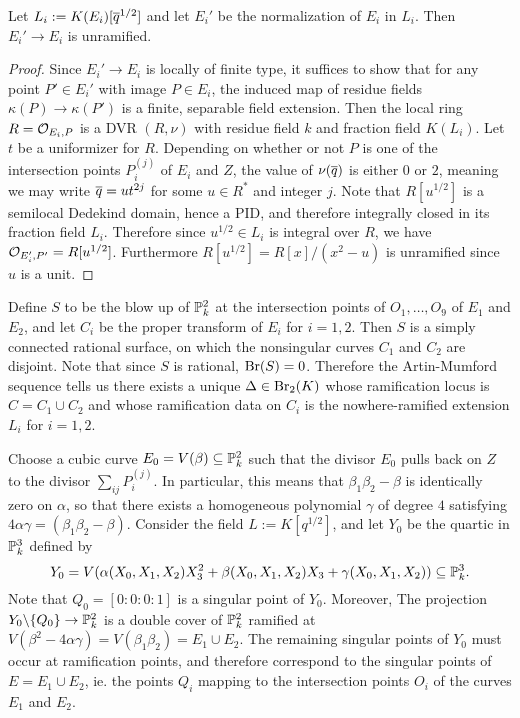 \begin{lem}
Let $L_i:=K(E_i)[\overline{q}^{1/2}]$ and let $E_i'$ be the normalization of $E_i$ in $L_i$.  Then $E_i'\rightarrow E_i$ is unramified.
\end{lem}
\begin{proof}
Since $E_i'\rightarrow E_i$ is locally of finite type, it suffices to show that for any point $P'\in E_i'$ with image $P\in E_i$, the induced map of residue fields $\kappa(P)\rightarrow\kappa(P')$ is a finite, separable field extension.  Then the local ring $R = \mathcal{O}_{E_i,P}$ is a DVR $(R,\nu)$ with residue field $k$ and fraction field $K(L_i)$.  Let $t$ be a uniformizer for $R$.  Depending on whether or not $P$ is one of the intersection points $P_i^{(j)}$ of $E_i$ and $Z$, the value of $\nu(\overline{q})$ is either $0$ or $2$, meaning we may write $\overline{q} = ut^{2j}$ for some $u\in R^*$ and integer $j$.  Note that $R[u^{1/2}]$ is a semilocal Dedekind domain, hence a PID, and therefore integrally closed in its fraction field $L_i$.  Therefore since $u^{1/2}\in L_i$ is integral over $R$, we have $\mathcal{O}_{E_i',P'} = R[u^{1/2}]$.  Furthermore $R[u^{1/2}] = R[x]/(x^2-u)$ is unramified since $u$ is a unit.
\end{proof}

Define $S$ to be the blow up of $\mathbb{P}_k^2$ at the intersection points of $O_1,\dots,O_9$ of $E_1$ and $E_2$, and let $C_i$ be the proper transform of $E_i$ for $i=1,2$.  Then $S$ is a simply connected rational surface, on which the nonsingular curves $C_1$ and $C_2$ are disjoint.  Note that since $S$ is rational, $\textnormal{Br}(S) = 0$.  Therefore the Artin-Mumford sequence tells us there exists a unique $\Delta\in\textnormal{Br}_2(K)$ whose ramification locus is $C = C_1\cup C_2$ and whose ramification data on $C_i$ is the nowhere-ramified extension $L_i$ for $i=1,2$.

Choose a cubic curve $E_0 = V(\beta)\subseteq \mathbb{P}^2_k$ such that the divisor $E_0$ pulls back on $Z$ to the divisor $\sum_{ij}P_i^{(j)}$.  In particular, this means that $\beta_1\beta_2-\beta$ is identically zero on $\alpha$, so that there exists a homogeneous polynomial $\gamma$ of degree $4$ satisfying $4\alpha\gamma = (\beta_1\beta_2-\beta)$.  Consider the field $L := K[q^{1/2}]$, and let $Y_0$ be the quartic in $\mathbb{P}^3_k$ defined by
$$Y_0 = V(\alpha(X_0,X_1,X_2)X_3^2 + \beta(X_0,X_1,X_2)X_3 + \gamma(X_0,X_1,X_2))\subseteq \mathbb{P}^3_k.$$
Note that $Q_0 = [0:0:0:1]$ is a singular point of $Y_0$.  Moreover, The projection $Y_0\backslash\{Q_0\}\rightarrow\mathbb{P}^2_k$ is a double cover of $\mathbb{P}^2_k$ ramified at $V(\beta^2-4\alpha\gamma) = V(\beta_1\beta_2) = E_1\cup E_2$.  The remaining singular points of $Y_0$ must occur at ramification points, and therefore correspond to the singular points of $E = E_1\cup E_2$, ie. the points $Q_i$ mapping to the intersection points $O_i$ of the curves $E_1$ and $E_2$.

